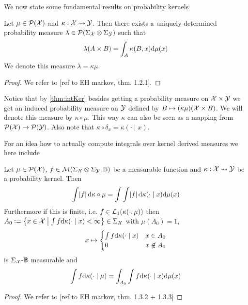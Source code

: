 \documentclass{article}
\begin{document}
We now state some fundamental results on probability kernels
\begin{thm}
  Let $\mu \in \mathcal{P}(\mathcal{X})$ and $\kappa : \mathcal{X} \leadsto \mathcal{Y}$.
  Then there exists a uniquely determined probability measure
  $\lambda \in \mathcal{P}(\Sigma_\mathcal{X} \otimes \Sigma_\mathcal{Y})$
  such that
  \[ \lambda(A \times B) = \int_A \kappa(B, x) \mathrm{d} \mu(x) \]
  \label{thm:intKer}
  We denote this measure $\lambda = \kappa \mu$.
\end{thm}
\begin{proof}
  We refer to [ref to EH markov, thm. 1.2.1].
\end{proof}

Notice that by \cref{thm:intKer}
besides getting a probability measure on $\mathcal{X} \times \mathcal{Y}$
we get an induced probability measure
on $\mathcal{Y}$ defined by $B \mapsto (\kappa \mu)(\mathcal{X} \times B)$.
We will denote this measure by $\kappa \circ \mu$.
This way $\kappa$ can also be seen as a mapping from
$\mathcal{P}(\mathcal{X}) \to \mathcal{P}(\mathcal{Y})$.
Also note that $\kappa \circ \delta_x = \kappa(\cdot \mid x)$.

For an idea how to actually compute integrals over kernel derived measures
we here include
\begin{thm}
  Let $\mu \in \mathcal{P}(\mathcal{X})$,
  $f \in \mathcal{M}(\Sigma_\mathcal{X} \otimes \Sigma_\mathcal{Y}, \mathbb{B})$
  be a measurable function and
  $\kappa : \mathcal{X} \leadsto \mathcal{Y}$ be a probability kernel.
  Then
  \[ \int \abs{f} \mathrm{d} \kappa \circ \mu
  = \int \int \abs{f} \mathrm{d} \kappa(\cdot \mid x) \mathrm{d} \mu(x) \]
  Furthermore if this is finite, i.e. $f \in \mathcal{L}_1(\kappa(\cdot, \mu))$
  then $A_0 \vcentcolon= \left\{ x \in \mathcal{X} \;\middle\vert\;
    \int f \mathrm{d} \kappa(\cdot \mid x) < \infty \right\}
  \in \Sigma_\mathcal{X}$
  with $\mu(A_0) = 1$, 
  \[ x \mapsto \begin{cases}
      \int f \mathrm{d} \kappa(\cdot \mid x) & x \in A_0
      \\ 0 & x \not\in A_0
  \end{cases} \]
  is $\Sigma_\mathcal{X}$-$\mathbb{B}$ measurable and
  \[ \int f \mathrm{d} \kappa(\cdot \mid \mu)
  = \int_{A_0} \int f \mathrm{d} \kappa(\cdot \mid x) \mathrm{d} \mu(x) \]  
  \label{thm:extTonFub}
\end{thm}
\begin{proof}
  We refer to [ref to EH markov, thm. 1.3.2 + 1.3.3]
\end{proof}
\end{document}
